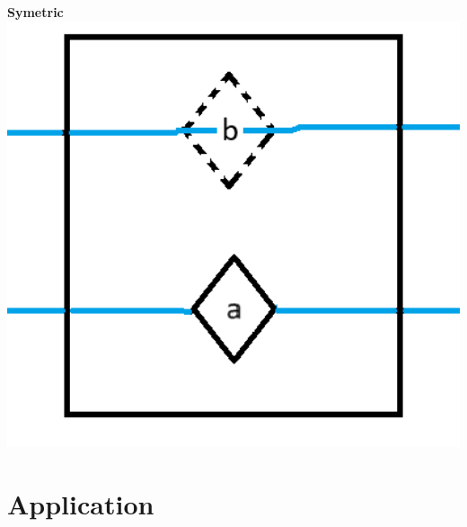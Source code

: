 \documentclass{beamer}
\begin{document}
\begin{frame}
\begin{minipage}[b]{0.32\textwidth}
  \end{minipage}
  \begin{minipage}[b]{0.32\textwidth}
    \textbf{Symetric}
    \includegraphics[width=1\textwidth]{res/doors/SelfClosingSymetricDoorAnim1.png}
  \end{minipage}
\end{frame}
\section{Application}
\end{document}
